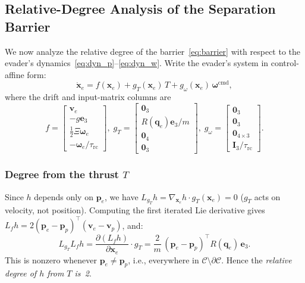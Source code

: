 \documentclass[lettersize,journal]{IEEEtran}
\theoremstyle{definition}
\theoremstyle{remark}
\newcommand{\R}{\mathbb{R}}
\newcommand{\vect}[1]{\bm{#1}}
\newcommand{\mat}[1]{\mathbf{#1}}
\begin{document}
\subsection{Relative-Degree Analysis of the Separation Barrier}
\label{sec:rel_deg}

We now analyze the relative degree of the barrier~\eqref{eq:barrier}
with respect to the evader's dynamics~\eqref{eq:dyn_p}--\eqref{eq:dyn_w}.
Write the evader's system in control-affine form:
\begin{equation}
    \dot{\vect{x}}_e = f(\vect{x}_e) + g_T(\vect{x}_e)\,T
                    + g_\omega(\vect{x}_e)\,\vect{\omega}^{\mathrm{cmd}},
    \label{eq:affine_evader}
\end{equation}
where the drift and input-matrix columns are
\begin{equation}
    f = \begin{bmatrix}\vect{v}_e\\-g\vect{e}_3\\ \tfrac{1}{2}\Xi\vect{\omega}_e\\-\vect{\omega}_e/\tau_{\mathrm{rc}}\end{bmatrix},\;
    g_T = \begin{bmatrix}\vect{0}_3\\R(\vect{q}_e)\vect{e}_3/m\\\vect{0}_4\\\vect{0}_3\end{bmatrix},\;
    g_\omega = \begin{bmatrix}\vect{0}_{3}\\\vect{0}_{3}\\\vect{0}_{4\times3}\\\mat{I}_3/\tau_{\mathrm{rc}}\end{bmatrix}.
    \label{eq:f_g}
\end{equation}

\subsubsection*{Degree from the thrust $T$}
Since $h$ depends only on $\vect{p}_e$, we have
$L_{g_T}h = \nabla_{\vect{x}_e}h \cdot g_T(\vect{x}_e) = 0$
($g_T$ acts on velocity, not position).
Computing the first iterated Lie derivative gives
$L_f h = 2(\vect{p}_e - \vect{p}_p)^\top(\vect{v}_e-\vect{v}_p)$, and:
\begin{equation}
    L_{g_T}L_f h
    = \frac{\partial (L_f h)}{\partial \vect{x}_e} \cdot g_T
    = \frac{2}{m}\,(\vect{p}_e-\vect{p}_p)^\top R(\vect{q}_e)\,\vect{e}_3.
    \label{eq:LgT_Lfh}
\end{equation}
This is nonzero whenever $\vect{p}_e \neq \vect{p}_p$, i.e.,
everywhere in $\mathcal{C} \setminus \partial\mathcal{C}$.
Hence the \emph{relative degree of $h$ from $T$ is~2}.
\end{document}
